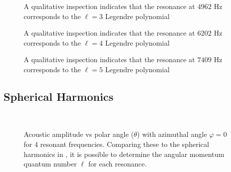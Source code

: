 \begin{figure}[H]
	\centering
	\qquad
	\caption{A qualitative inspection indicates that the resonance at $4962$ Hz corresponds to the $\ell=3$ Legendre polynomial}
	\label{legendre3}
\end{figure}

\begin{figure}[H]
	\centering
	\qquad
	\caption{A qualitative inspection indicates that the resonance at $6202$ Hz corresponds to the $\ell=4$ Legendre polynomial}
	\label{legendre4}
\end{figure}

\begin{figure}[H]
	\centering
	\qquad
	\caption{A qualitative inspection indicates that the resonance at $7409$ Hz corresponds to the $\ell=5$ Legendre polynomial}
	\label{legendre5}
\end{figure}

\subsection{Spherical Harmonics}


\begin{figure}[H]
	\centering
	\qquad
	\\
	\qquad
	\caption{Acoustic amplitude vs polar angle ($\theta$) with azimuthal angle $\varphi = 0$ for 4 resonant frequencies. Comparing these to the spherical harmonics in , it is possible to determine the angular momentum quantum number $\ell$ for each resonance.}
	\label{polarGraphs}
\end{figure}

